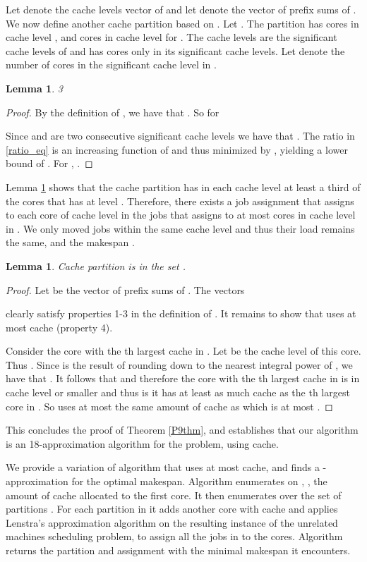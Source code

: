 \documentclass[11pt]{article}
\newtheorem{lemma}[theorem]{Lemma}
\begin{document}
Let  denote the cache levels vector of  and let
 denote the vector of prefix sums of . We now define another
cache partition  based on . Let . The partition  has
 cores in cache level , and 
cores in cache level  for . The cache levels
 are the significant cache levels of  and
 has cores only in its significant cache levels. Let
 denote the number of cores   in the significant cache
level  in  .

\begin{lemma} \label{pppp}
 3
\end{lemma}
\begin{proof}
By the definition of , we have that . So for 

Since  and  are two consecutive significant cache
levels we have that . The ratio in
\ref{ratio_eq} is an increasing function of  and thus
 minimized by , yielding a lower bound of
. For ,
.
\end{proof}

Lemma \ref{pppp} shows that the cache partition   has in
each cache level  at least a third of the cores that  has at
level . Therefore, there exists a job assignment  that
assigns to each core of cache level  in   the jobs that
 assigns to at most  cores in cache level  in . We
only moved jobs within the same cache level and thus their load
remains the same, and the makespan .

\begin{lemma}\label{lem_hatinp}
Cache partition  is in the  set .
\end{lemma}
\begin{proof}
Let   be the vector of prefix sums of . The
vectors

clearly satisfy properties 1-3 in the definition of
. It remains to show that  uses at most
 cache (property 4).

Consider the core  with the th largest cache in . Let
 be the cache level of this core. Thus . Since   is the result of rounding down
 to the nearest integral power of , we have
that . It follows that
 and therefore the core with the th
largest cache in  is in cache level  or smaller and thus
is it has at least as much cache as the th largest core in
. So  uses at most the same amount of cache as
 which is at most .
\end{proof}

This concludes the proof of Theorem \ref{P9thm}, and establishes
that our algorithm  is an 18-approximation algorithm for the
problem, using  cache.

We provide a variation of algorithm  that uses at most  cache, and finds a -approximation for  the optimal makespan.
Algorithm  enumerates on , , the amount of cache allocated to the first core.
It then enumerates over the set of partitions .
For each partition in  it adds another core with  cache and applies Lenstra's approximation algorithm on the resulting instance of the unrelated machines scheduling problem, to assign all the jobs in  to the  cores. Algorithm  returns the partition and assignment with the minimal makespan it encounters.
\end{document}
